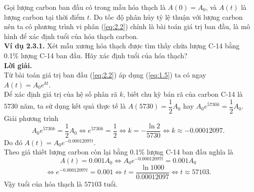 Gọi lượng carbon ban đầu có trong mẫu hóa thạch là $A(0)={{A}_{0}}$, và $A(t)$ là lượng carbon tại thời điểm $t$. Do tốc độ phân hủy tỷ lệ thuận với lượng carbon nên ta có phương trình vi phân (\ref{eq:2.2}) chính là bài toán giá trị ban đầu, là mô hình để xác định tuổi của hóa thạch carbon.\\
\textbf{Ví dụ 2.3.1.}  Xét mẫu xương hóa thạch được tìm thấy chứa lượng C-14 bằng 0.1\% lượng C-14 ban đầu. Hãy xác định tuổi của hóa thạch?\\
\textbf{Lời giải.  }\\
Từ bài toán giá trị ban đầu (\ref{eq:2.2}) áp dụng (\ref{eq:1.5}) ta có ngay $A(t)={{A}_{0}}{{e}^{kt}}$. \\
Để xác định giá trị của hệ số phân rã $k$, biết chu kỳ bán rã của carbon C-14 là $5730$ năm, ta sử dụng kết quả thực tế là $A(5730)=\dfrac{1}{2}{{A}_{0}}$ hay ${{A}_{0}}{{e}^{5730k}}=\dfrac{1}{2}{{A}_{0}}$.\\  
Giải phương trình
\[{{A}_{0}}{{e}^{5730k}}=\dfrac{1}{2}{{A}_{0}}\Leftrightarrow {{e}^{5730k}}=\dfrac{1}{2}\Leftrightarrow k=-\dfrac{\ln 2}{5730}\Leftrightarrow k\approx -0.00012097.\]
Do đó $A(t)={{A}_{0}}{{e}^{-0.00012097t}}.$\\
Theo giả thiết lượng carbon còn lại bằng 0.1\% lượng C-14 ban đầu nghĩa là
$$ A(t)=0.001{{A}_{0}}\Leftrightarrow {{A}_{0}}{{e}^{-0.00012097t}}=0.001{{A}_{0}} $$ 
	 $$\Leftrightarrow {{e}^{-0.00012097t}}=0.001\Leftrightarrow t=\dfrac{\ln 1000}{0.00012097}\Leftrightarrow t\approx 57103.$$
Vậy tuổi của hóa thạch là $57103$ tuổi.
